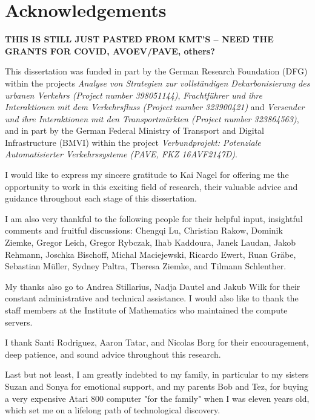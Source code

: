
\thispagestyle{empty}

\chapter*{Acknowledgements}

\textbf{THIS IS STILL JUST PASTED FROM KMT'S -- NEED THE GRANTS FOR COVID, AVOEV/PAVE, others?}

This dissertation was funded in part by the German Research Foundation (DFG) within the projects
\emph{Analyse von Strategien zur vollständigen Dekarbonisierung des urbanen Verkehrs (Project number 398051144)},
\emph{Frachtführer und ihre Interaktionen mit dem Verkehrsfluss (Project number 323900421)} and
\emph{Versender und ihre Interaktionen mit den Transportmärkten (Project number 323864563)},
and in part by the German Federal Ministry of Transport and Digital Infrastructure (BMVI) within the project
\emph{Verbundprojekt: Potenziale Automatisierter Verkehrssysteme (PAVE, FKZ 16AVF2147D)}.

I would like to express my sincere gratitude to Kai Nagel for offering me the opportunity to work in this exciting field of research, their valuable advice and guidance throughout each stage of this dissertation.

I am also very thankful to the following people for their helpful input, insightful comments and fruitful discussions:
Chengqi Lu,
Christian Rakow,
Dominik Ziemke,
Gregor Leich,
Gregor Rybczak,
Ihab Kaddoura,
Janek Laudan,
Jakob Rehmann,
Joschka Bischoff,
Michal Maciejewski,
Ricardo Ewert,
Ruan Gräbe,
Sebastian Müller,
Sydney Paltra,
Theresa Ziemke,
and Tilmann Schlenther.

My thanks also go to Andrea Stillarius, Nadja Dautel and Jakub Wilk for their constant administrative and technical assistance. I would also like to thank the staff members at the Institute of Mathematics who maintained the compute servers.

I thank Santi Rodriguez, Aaron Tatar, and Nicolas Borg for their encouragement, deep patience, and sound advice throughout this research.

Last but not least, I am greatly indebted to my family, in particular to my sisters Suzan and Sonya for emotional support, and my parents Bob and Tez, for buying a very expensive Atari 800 computer "for the family" when I was eleven years old, which set me on a lifelong path of technological discovery.

\newpage
